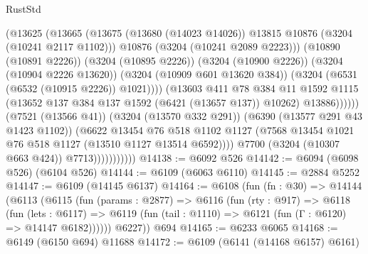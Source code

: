 \begin{lexlean}{RustStd}
\begin{coremodule}
                                        (@13625
                                          (@13665
                                            (@13675
                                              (@13680 (@14023 @14026))
                                              @13815
                                              @10876
                                              (@3204 (@10241 @2117 @1102)))
                                            @10876
                                            (@3204 (@10241 @2089 @2223)))
                                          (@10890 (@10891 @2226))
                                          (@3204 (@10895 @2226))
                                          (@3204 (@10900 @2226))
                                          (@3204 (@10904 @2226 @13620))
                                          (@3204 (@10909 @601 @13620 @384))
                                          (@3204 (@6531 (@6532 (@10915 @2226)) @1021))))
                                      (@13603
                                        @411
                                        @78
                                        @384
                                        @11
                                        @1592
                                        @1115
                                        (@13652 @137 @384 @137 @1592 (@6421 (@13657 @137)) @10262)
                                        @13886))))))
                            (@7521 (@13566 @41))
                            (@3204 (@13570 @332 @291))
                            (@6390 (@13577 @291 @43 @1423 @1102))
                            (@6622
                              @13454
                              @76
                              @518
                              @1102
                              @1127
                              (@7568 @13454 @1021 @76 @518 @1127 (@13510 @1127 @13514 @6592))))
                          @7700
                          (@3204 (@10307 @663 @424))
                          @7713)))))))))))
@14138 := @6092 @526
@14142 := @6094 (@6098 @526) (@6104 @526)
@14144 := @6109 (@6063 @6110)
@14145 := @2884 @5252
@14147 := @6109 (@14145 @6137)
@14164 := @6108
    (fun (fn : @30) =>
    @14144
      (@6113
        (@6115
          (fun (params : @2877) =>
          @6116
            (fun (rty : @917) =>
            @6118
              (fun (lets : @6117) =>
              @6119 (fun (tail : @1110) => @6121 (fun (Γ : @6120) => @14147 @6182))))))
        @6227))
    @694
@14165 := @6233 @6065
@14168 := @6149 (@6150 @694) @11688
@14172 := @6109 (@6141 (@14168 @6157) @6161)

\end{coremodule}
\end{lexlean}
